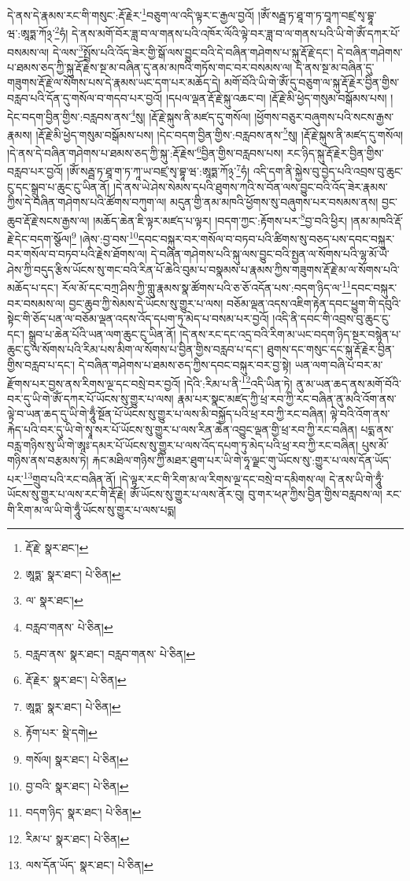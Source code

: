 དེ་ནས་དེ་རྣམས་རང་གི་གསུང་:རྡོ་རྗེར་\footnote{རྡོ་རྗེ་  སྣར་ཐང་། }བཅུག་ལ་འདི་ལྟར་ང་རྒྱལ་བྱའོ། །ཨོཾ་སརྦྦ་ཏ་ཐཱ་ག་ཏ་བཱཀ་བཛྲ་སྭ་བྷཱ་ཝ་:ཨཱཏྨ་ཀོ྅་\footnote{ཨཱཏྨ་  སྣར་ཐང་།  པེ་ཅིན། }ཧཾ། དེ་ནས་མགོ་བོར་ཟླ་བ་ལ་གནས་པའི་འཁོར་ལོའི་ལྟེ་བར་ཟླ་བ་ལ་གནས་པའི་ཡི་གེ་ཨོཾ་དཀར་པོ་བསམས་ལ། དེ་ལས་\footnote{ལ་  སྣར་ཐང་། }སྤྲོས་པའི་འོད་ཟེར་གྱི་སྒོ་ལས་བྱུང་བའི་དེ་བཞིན་གཤེགས་པ་སྐུ་རྡོ་རྗེ་དང་། དེ་བཞིན་གཤེགས་པ་ཐམས་ཅད་ཀྱི་སྐུ་རྡོ་རྗེས་སྔ་མ་བཞིན་དུ་ནམ་མཁའི་གཏོས་གང་བར་བསམས་ལ། དེ་ནས་སྔ་མ་བཞིན་དུ་གཟུགས་རྡོ་རྗེ་ལ་སོགས་པས་དེ་རྣམས་ཡང་དག་པར་མཆོད་དེ། མགོ་བོའི་ཡི་གེ་ཨོཾ་དུ་བཅུག་ལ་སྐུ་རྡོ་རྗེར་བྱིན་གྱིས་བརླབ་པའི་དོན་དུ་གསོལ་བ་གདབ་པར་བྱའོ། །དཔལ་ལྡན་རྡོ་རྗེ་སྐུ་འཆང་བ། །རྡོ་རྗེ་མི་ཕྱེད་གསུམ་བསྒོམས་པས། །དེང་བདག་བྱིན་གྱིས་:བརླབས་ནས་\footnote{བརླབ་གནས་  པེ་ཅིན། }སུ། །རྡོ་རྗེ་སྐུས་ནི་མཛད་དུ་གསོལ། །ཕྱོགས་བཅུར་བཞུགས་པའི་སངས་རྒྱས་རྣམས། །རྡོ་རྗེ་མི་ཕྱེད་གསུམ་བསྒོམས་པས། །དེང་བདག་བྱིན་གྱིས་:བརླབས་ནས་\footnote{བརླབ་ནས་  སྣར་ཐང་། བརླབ་གནས་  པེ་ཅིན། }སུ། །རྡོ་རྗེ་སྐུས་ནི་མཛད་དུ་གསོལ། །དེ་ནས་དེ་བཞིན་གཤེགས་པ་ཐམས་ཅད་ཀྱི་སྐུ་:རྡོ་རྗེས་\footnote{རྡོ་རྗེར་  སྣར་ཐང་།  པེ་ཅིན། }བྱིན་གྱིས་བརླབས་པས། རང་ཉིད་སྐུ་རྡོ་རྗེར་བྱིན་གྱིས་བརླབ་པར་བྱའོ། །ཨོཾ་སརྦྦ་ཏ་ཐཱ་ག་ཏ་ཀཱ་ཡ་བཛྲ་སྭ་བྷཱ་ཝ་:ཨཱཏྨ་ཀོ྅་\footnote{ཨཱཏྨ་  སྣར་ཐང་།  པེ་ཅིན། }ཧཾ། འདི་དག་ནི་སྐྱེས་བུ་བྱེད་པའི་འབྲས་བུ་ཆུང་ངུ་དང་སྒྲུབ་པ་ཆུང་ངུ་ཡིན་ནོ། །དེ་ནས་ཡེ་ཤེས་སེམས་དཔའི་ཐུགས་ཀའི་ས་བོན་ལས་བྱུང་བའི་འོད་ཟེར་རྣམས་ཀྱིས་དེ་བཞིན་གཤེགས་པའི་ཚོགས་བཀུག་ལ། མདུན་གྱི་ནམ་མཁའི་ཕྱོགས་སུ་བཞུགས་པར་བསམས་ནས། བྱང་ཆུབ་རྡོ་རྗེ་སངས་རྒྱས་ལ། །མཆོད་ཆེན་ཇི་ལྟར་མཛད་པ་ལྟར། །བདག་ཀྱང་:རྟོགས་པར་\footnote{རྟོག་པར་  སྡེ་དགེ། }བྱ་བའི་ཕྱིར། །ནམ་མཁའི་རྡོ་རྗེ་དེང་བདག་སྩོལ།\footnote{གསོལ།  སྣར་ཐང་།  པེ་ཅིན། } །ཞེས་:བྱ་བས་\footnote{བྱ་བའི་  སྣར་ཐང་།  པེ་ཅིན། }དབང་བསྐུར་བར་གསོལ་བ་བཏབ་པའི་ཚིགས་སུ་བཅད་པས་དབང་བསྐུར་བར་གསོལ་བ་བཏབ་པའི་རྗེས་ཐོགས་ལ། དེ་བཞིན་གཤེགས་པའི་སྐུ་ལས་བྱུང་བའི་སྤྱན་ལ་སོགས་པའི་ལྷ་མོ་ཡེ་ཤེས་ཀྱི་བདུད་རྩིས་ཡོངས་སུ་གང་བའི་རིན་པོ་ཆེའི་བུམ་པ་བསྣམས་པ་རྣམས་ཀྱིས་གཟུགས་རྡོ་རྗེ་མ་ལ་སོགས་པའི་མཆོད་པ་དང་། རོལ་མོ་དང་བཀྲ་ཤིས་ཀྱི་གླུ་རྣམས་སྣ་ཚོགས་པའི་ཅ་ཅོ་འདོན་པས་:བདག་ཉིད་ལ་\footnote{བདག་ཉིད་  སྣར་ཐང་།  པེ་ཅིན། }དབང་བསྐུར་བར་བསམས་ལ། བྱང་ཆུབ་ཀྱི་སེམས་དེ་ཡོངས་སུ་གྱུར་པ་ལས། བཅོམ་ལྡན་འདས་འཇིག་རྟེན་དབང་ཕྱུག་གི་དབུའི་སྟེང་གི་ཅོད་པན་ལ་བཅོམ་ལྡན་འདས་འོད་དཔག་ཏུ་མེད་པ་བསམ་པར་བྱའོ། །འདི་ནི་དབང་གི་འབྲས་བུ་ཆུང་ངུ་དང་། སྒྲུབ་པ་ཆེན་པོའི་ཡན་ལག་ཆུང་ངུ་ཡིན་ནོ། །དེ་ནས་རང་དང་འདྲ་བའི་རིག་མ་ཡང་བདག་ཉིད་སྔར་བསྙེན་པ་ཆུང་ངུ་ལ་སོགས་པའི་རིམ་པས་མིག་ལ་སོགས་པ་བྱིན་གྱིས་བརླབ་པ་དང་། ཐུགས་དང་གསུང་དང་སྐུ་རྡོ་རྗེར་བྱིན་གྱིས་བརླབ་པ་དང་། དེ་བཞིན་གཤེགས་པ་ཐམས་ཅད་ཀྱིས་དབང་བསྐུར་བར་བྱ་སྟེ། ཡན་ལག་བཞི་པ་བར་མ་རྫོགས་པར་བྱས་ནས་རིགས་ལྔ་དང་བསྲེ་བར་བྱའོ། །དེའི་:རིམ་པ་ནི་\footnote{རིམ་པ་  སྣར་ཐང་།  པེ་ཅིན། }འདི་ཡིན་ཏེ། ནུ་མ་ཡན་ཆད་ནས་མགོ་བོའི་བར་དུ་ཡི་གེ་ཨོཾ་དཀར་པོ་ཡོངས་སུ་གྱུར་པ་ལས། རྣམ་པར་སྣང་མཛད་ཀྱི་ཕྲ་རབ་ཀྱི་རང་བཞིན་ནུ་མའི་འོག་ནས་ལྟེ་བ་ཡན་ཆད་དུ་ཡི་གེ་ཧཱུྃ་སྔོན་པོ་ཡོངས་སུ་གྱུར་པ་ལས་མི་བསྐྱོད་པའི་ཕྲ་རབ་ཀྱི་རང་བཞིན། ལྟེ་བའི་འོག་ནས་རྐེད་པའི་བར་དུ་ཡི་གེ་སྭཱ་སར་པོ་ཡོངས་སུ་གྱུར་པ་ལས་རིན་ཆེན་འབྱུང་ལྡན་གྱི་ཕྲ་རབ་ཀྱི་རང་བཞིན། པདྨ་ནས་བརླ་གཉིས་སུ་ཡི་གེ་ཨཱཿ་དམར་པོ་ཡོངས་སུ་གྱུར་པ་ལས་འོད་དཔག་ཏུ་མེད་པའི་ཕྲ་རབ་ཀྱི་རང་བཞིན། པུས་མོ་གཉིས་ནས་བརྩམས་ཏེ། རྐང་མཐིལ་གཉིས་ཀྱི་མཐར་ཐུག་པར་ཡི་གེ་ཧཱ་ལྗང་གུ་ཡོངས་སུ་:གྱུར་པ་ལས་དོན་ཡོད་པར་\footnote{ལས་དོན་ཡོད་  སྣར་ཐང་།  པེ་ཅིན། }གྲུབ་པའི་རང་བཞིན་ནོ། །དེ་ལྟར་རང་གི་རིག་མ་ལ་རིགས་ལྔ་དང་བསྲེ་བ་དམིགས་ལ། དེ་ནས་ཡི་གེ་ཧཱུྃ་ཡོངས་སུ་གྱུར་པ་ལས་རང་གི་རྡོ་རྗེ། ཨོཾ་ཡོངས་སུ་གྱུར་པ་ལས་ནོར་བུ། བུ་གར་ཕཊ་ཀྱིས་བྱིན་གྱིས་བརླབས་ལ། རང་གི་རིག་མ་ལ་ཡི་གེ་ཧཱུྃ་ཡོངས་སུ་གྱུར་པ་ལས་པདྨ། 